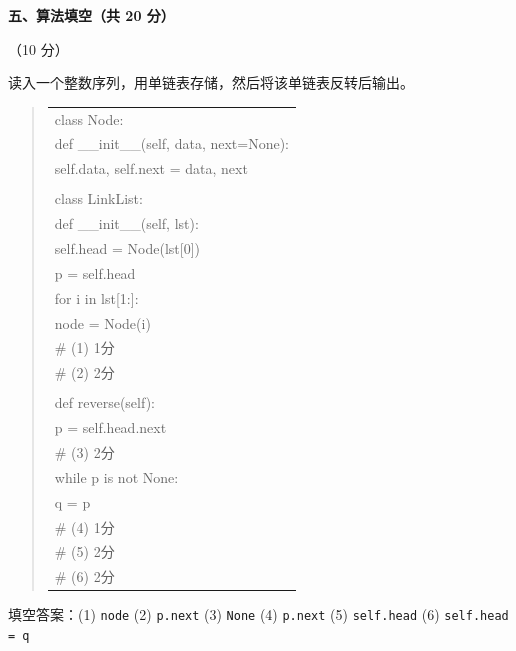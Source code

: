 \textbf{五、算法填空（共 20 分）}

\begin{question}[单链表反转]（10 分）

读入一个整数序列，用单链表存储，然后将该单链表反转后输出。

\begin{quote}
\footnotesize
\begin{tabular}{@{}l@{}}
class Node:\\
    def \_\_init\_\_(self, data, next=None):\\
        self.data, self.next = data, next\\
\\
class LinkList:\\
    def \_\_init\_\_(self, lst):\\
        self.head = Node(lst[0])\\
        p = self.head\\
        for i in lst[1:]:\\
            node = Node(i)\\
\underline{\hspace{12em}} \# (1) 1分\\
\underline{\hspace{12em}} \# (2) 2分\\
\\
    def reverse(self):\\
        p = self.head.next\\
\underline{\hspace{12em}} \# (3) 2分\\
        while p is not None:\\
            q = p\\
\underline{\hspace{12em}} \# (4) 1分\\
\underline{\hspace{12em}} \# (5) 2分\\
\underline{\hspace{12em}} \# (6) 2分\\
\end{tabular}
\end{quote}

\begin{solution}
填空答案：(1) \texttt{node} (2) \texttt{p.next} (3) \texttt{None} (4) \texttt{p.next} (5) \texttt{self.head} (6) \texttt{self.head = q}
\end{solution}
\end{question}

